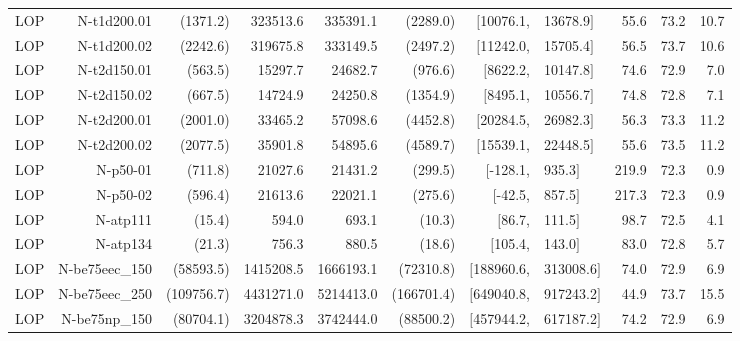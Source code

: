 \documentclass[runningheads]{llncs}
\begin{document}
\begin{table}[tb]
{\begin{tabular}{*{6}{r}rl*{3}{r}}
    LOP     & N-t1d200.01      & (1371.2)        & 323513.6         & 335391.1                & (2289.0)   & $[$10076.1,   & 13678.9$]$    & 55.6 & 73.2 & 10.7 \\
    LOP     & N-t1d200.02      & (2242.6)        & 319675.8         & 333149.5                & (2497.2)   & $[$11242.0,   & 15705.4$]$    & 56.5 & 73.7 & 10.6 \\
    LOP     & N-t2d150.01      & (563.5)         & 15297.7          & 24682.7                 & (976.6)    & $[$8622.2,    & 10147.8$]$    & 74.6 & 72.9 & 7.0  \\
    LOP     & N-t2d150.02      & (667.5)         & 14724.9          & 24250.8                 & (1354.9)   & $[$8495.1,    & 10556.7$]$    & 74.8 & 72.8 & 7.1  \\
    LOP     & N-t2d200.01      & (2001.0)        & 33465.2          & 57098.6                 & (4452.8)   & $[$20284.5,   & 26982.3$]$    & 56.3 & 73.3 & 11.2 \\
    LOP     & N-t2d200.02      & (2077.5)        & 35901.8          & 54895.6                 & (4589.7)   & $[$15539.1,   & 22448.5$]$    & 55.6 & 73.5 & 11.2 \\
    LOP     & N-p50-01         & (711.8)         & 21027.6          & 21431.2                 & (299.5)    & $[$-128.1,    & 935.3$]$      & 219.9& 72.3 & 0.9  \\
    LOP     & N-p50-02         & (596.4)         & 21613.6          & 22021.1                 & (275.6)    & $[$-42.5,     & 857.5$]$      & 217.3& 72.3 & 0.9  \\
    LOP     & N-atp111         & (15.4)          & 594.0            & 693.1                   & (10.3)     & $[$86.7,      & 111.5$]$      & 98.7 & 72.5 & 4.1  \\
    LOP     & N-atp134         & (21.3)          & 756.3            & 880.5                   & (18.6)     & $[$105.4,     & 143.0$]$      & 83.0 & 72.8 & 5.7  \\
    LOP     & N-be75eec\_150   & (58593.5)       & 1415208.5        & 1666193.1               & (72310.8)  & $[$188960.6,  & 313008.6$]$   & 74.0 & 72.9 & 6.9  \\
    LOP     & N-be75eec\_250   & (109756.7)      & 4431271.0        & 5214413.0               & (166701.4) & $[$649040.8,  & 917243.2$]$   & 44.9 & 73.7 & 15.5 \\
    LOP     & N-be75np\_150    & (80704.1)       & 3204878.3        & 3742444.0               & (88500.2)  & $[$457944.2,  & 617187.2$]$   & 74.2 & 72.9 & 6.9  \\

\end{tabular}}
\end{table}
\end{document}
